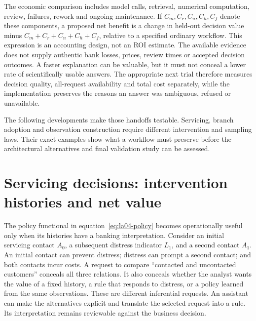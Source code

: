 The economic comparison includes model calls, retrieval, numerical computation,
review, failures, rework and ongoing maintenance. If $C_m,C_r,C_n,C_h,C_f$ denote
these components, a proposed net benefit is a change in held-out decision value
minus $C_m+C_r+C_n+C_h+C_f$, relative to a specified ordinary workflow.
This expression is an accounting design, not an ROI estimate. The available
evidence does not supply authentic bank losses, prices, review times or accepted
decision outcomes. A faster explanation can be valuable, but it must not conceal
a lower rate of scientifically usable answers. The appropriate next trial
therefore measures decision quality, all-request availability and total cost
separately, while the implementation preserves the reasons an answer was
ambiguous, refused or unavailable.

The following developments make those handoffs testable. Servicing, branch
adoption and observation construction require different intervention and
sampling laws. Their exact examples show what a workflow must preserve before
the architectural alternatives and final validation study can be assessed.


\section{Servicing decisions: intervention histories and net value}
\label{exec14:l5-servicing}

The policy functional in equation~\eqref{eq:la04-policy} becomes operationally
useful only when its histories have a banking interpretation. Consider an
initial servicing contact $A_0$, a subsequent distress indicator $L_1$, and a
second contact $A_1$. An initial contact can prevent distress; distress can
prompt a second contact; and both contacts incur costs. A request to compare
``contacted and uncontacted customers'' conceals all three relations. It also
conceals whether the analyst wants the value of a fixed history, a rule that
responds to distress, or a policy learned from the same observations. These are
different inferential requests. An assistant can make the alternatives explicit
and translate the selected request into a rule. Its interpretation remains
reviewable against the business decision.

